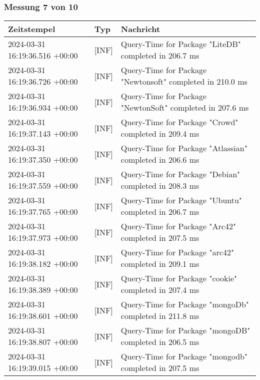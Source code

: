     \subsubsection{Messung 7 von 10} \label{subsubsec:MySQLOhneIndex7von10}
        {
            {\small
                \begin{tabularx}{\textwidth}{|l|l|X|}
                    \hline
                    \textbf{Zeitstempel} & \textbf{Typ} & \textbf{Nachricht} \\
                    \hline
                    \endhead
                    2024-03-31 16:19:36.516 +00:00 & [INF] & Query-Time for Package "LiteDB" completed in 206.7 ms \\
                    2024-03-31 16:19:36.726 +00:00 & [INF] & Query-Time for Package "Newtonsoft" completed in 210.0 ms \\
                    2024-03-31 16:19:36.934 +00:00 & [INF] & Query-Time for Package "NewtonSoft" completed in 207.6 ms \\
                    2024-03-31 16:19:37.143 +00:00 & [INF] & Query-Time for Package "Crowd" completed in 209.4 ms \\
                    2024-03-31 16:19:37.350 +00:00 & [INF] & Query-Time for Package "Atlassian" completed in 206.6 ms \\
                    2024-03-31 16:19:37.559 +00:00 & [INF] & Query-Time for Package "Debian" completed in 208.3 ms \\
                    2024-03-31 16:19:37.765 +00:00 & [INF] & Query-Time for Package "Ubuntu" completed in 206.7 ms \\
                    2024-03-31 16:19:37.973 +00:00 & [INF] & Query-Time for Package "Arc42" completed in 207.5 ms \\
                    2024-03-31 16:19:38.182 +00:00 & [INF] & Query-Time for Package "arc42" completed in 209.1 ms \\
                    2024-03-31 16:19:38.389 +00:00 & [INF] & Query-Time for Package "cookie" completed in 207.4 ms \\
                    2024-03-31 16:19:38.601 +00:00 & [INF] & Query-Time for Package "mongoDb" completed in 211.8 ms \\
                    2024-03-31 16:19:38.807 +00:00 & [INF] & Query-Time for Package "mongoDB" completed in 206.5 ms \\
                    2024-03-31 16:19:39.015 +00:00 & [INF] & Query-Time for Package "mongodb" completed in 207.5 ms \\

\end{tabularx}}}

